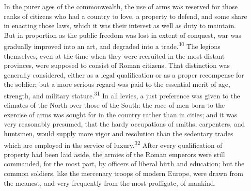 In the purer ages of the commonwealth, the use of arms was
reserved for those ranks of citizens who had a country to love, a
property to defend, and some share in enacting those laws, which
it was their interest as well as duty to maintain. But in
proportion as the public freedom was lost in extent of conquest,
war was gradually improved into an art, and degraded into a
trade.\textsuperscript{30} The legions themselves, even at the time when they were
recruited in the most distant provinces, were supposed to consist
of Roman citizens. That distinction was generally considered,
either as a legal qualification or as a proper recompense for the
soldier; but a more serious regard was paid to the essential
merit of age, strength, and military stature.\textsuperscript{31} In all levies, a
just preference was given to the climates of the North over those
of the South: the race of men born to the exercise of arms was
sought for in the country rather than in cities; and it was very
reasonably presumed, that the hardy occupations of smiths,
carpenters, and huntsmen, would supply more vigor and resolution
than the sedentary trades which are employed in the service of
luxury.\textsuperscript{32} After every qualification of property had been laid
aside, the armies of the Roman emperors were still commanded, for
the most part, by officers of liberal birth and education; but
the common soldiers, like the mercenary troops of modern Europe,
were drawn from the meanest, and very frequently from the most
profligate, of mankind.



